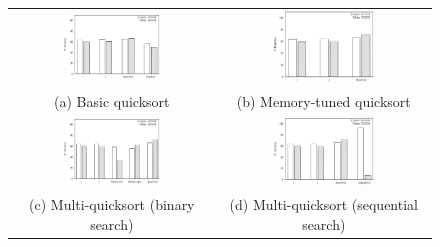 \documentclass[acmtocl]{acmtrans2m}
\begin{document}
\begin{figure}
\centering
\begin{tabular}{cc}
\includegraphics[width=0.5\textwidth]{plots/counter_base_quicksort__median_of_3__0.eps} & \includegraphics[width=0.5\textwidth]{plots/counter_memory_tuned_quicksort_0.eps} \\
(a) Basic quicksort & (b) Memory-tuned quicksort \\ 
\includegraphics[width=0.5\textwidth]{plots/counter_multi_quicksort__binary_search__0.eps} & \includegraphics[width=0.5\textwidth]{plots/counter_multi_quicksort__sequential_search__0.eps} \\
(c) Multi-quicksort (binary search) & (d) Multi-quicksort (sequential search)

\end{tabular}
\end{figure}
\end{document}
